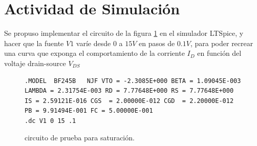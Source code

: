   \section{Actividad de Simulación}
    Se propuso implementar el circuito de la figura \ref{crkt:jfet-sat} en el simulador LTSpice, y hacer que la fuente
    $V1$ varíe desde $0$ a $15V$ en pasos de $0.1V$, para poder recrear una curva que exponga el comportamiento de la
    corriente $I_D$ en función del voltaje drain-source $V_{DS}$ 
    \begin{figure}[!ht]
      \centering
      \begin{minipage}{0.45\textwidth}
        \caption{circuito de prueba para saturación.}
        \label{crkt:jfet-sat}
      \end{minipage}
      \hfill
      \begin{minipage}{0.45\textwidth}
        \begin{lstlisting}[style=ltspice, caption={Parámetros de simulación LTspice}, label=list:jfet-sat]
.MODEL  BF245B   NJF VTO = -2.3085E+000 BETA = 1.09045E-003 LAMBDA = 2.31754E-003 RD = 7.77648E+000 RS = 7.77648E+000 IS = 2.59121E-016 CGS  = 2.00000E-012 CGD  = 2.20000E-012 PB = 9.91494E-001 FC = 5.00000E-001
.dc V1 0 15 .1
        \end{lstlisting}
      \end{minipage}
    \end{figure}

